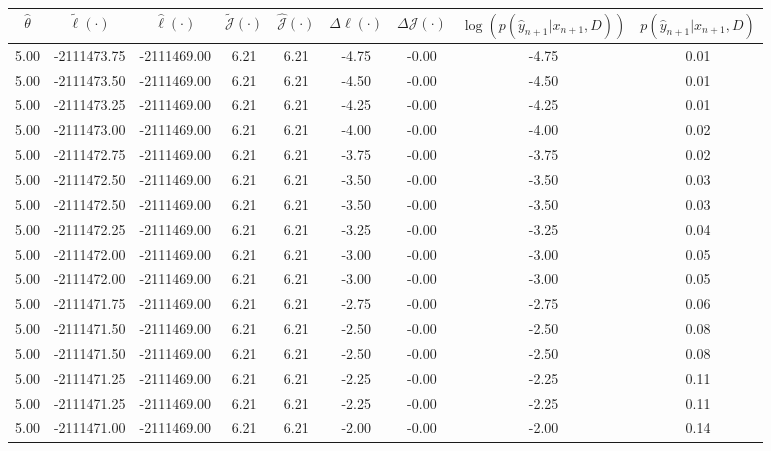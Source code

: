 \begin{table}[htbp]
        \centering
        \tiny
        \begin{adjustbox}{angle=90}
            \begin{tabular}{|c|c|c|c|c|c|c|c|c|}
                \hline
                 $\hat{\theta}$ & $\tilde{\ell}(\cdot)$ & $\hat{\ell}(\cdot)$ & $\tilde{\mathcal{J}}(\cdot)$ & $\hat{\mathcal{J}}(\cdot)$ & $\Delta \ell(\cdot)$ & $\Delta \mathcal{J}(\cdot)$ & $\log(p(\hat{y}_{n+1}|x_{n+1}, D))$ & $p(\hat{y}_{n+1}|x_{n+1}, D)$ \\
                \hline
                 5.00 & -2111473.75 & -2111469.00 & 6.21 & 6.21 & -4.75 & -0.00 & -4.75 & 0.01\\ \hline
 5.00 & -2111473.50 & -2111469.00 & 6.21 & 6.21 & -4.50 & -0.00 & -4.50 & 0.01\\ \hline
 5.00 & -2111473.25 & -2111469.00 & 6.21 & 6.21 & -4.25 & -0.00 & -4.25 & 0.01\\ \hline
 5.00 & -2111473.00 & -2111469.00 & 6.21 & 6.21 & -4.00 & -0.00 & -4.00 & 0.02\\ \hline
 5.00 & -2111472.75 & -2111469.00 & 6.21 & 6.21 & -3.75 & -0.00 & -3.75 & 0.02\\ \hline
 5.00 & -2111472.50 & -2111469.00 & 6.21 & 6.21 & -3.50 & -0.00 & -3.50 & 0.03\\ \hline
 5.00 & -2111472.50 & -2111469.00 & 6.21 & 6.21 & -3.50 & -0.00 & -3.50 & 0.03\\ \hline
 5.00 & -2111472.25 & -2111469.00 & 6.21 & 6.21 & -3.25 & -0.00 & -3.25 & 0.04\\ \hline
 5.00 & -2111472.00 & -2111469.00 & 6.21 & 6.21 & -3.00 & -0.00 & -3.00 & 0.05\\ \hline
 5.00 & -2111472.00 & -2111469.00 & 6.21 & 6.21 & -3.00 & -0.00 & -3.00 & 0.05\\ \hline
 5.00 & -2111471.75 & -2111469.00 & 6.21 & 6.21 & -2.75 & -0.00 & -2.75 & 0.06\\ \hline
 5.00 & -2111471.50 & -2111469.00 & 6.21 & 6.21 & -2.50 & -0.00 & -2.50 & 0.08\\ \hline
 5.00 & -2111471.50 & -2111469.00 & 6.21 & 6.21 & -2.50 & -0.00 & -2.50 & 0.08\\ \hline
 5.00 & -2111471.25 & -2111469.00 & 6.21 & 6.21 & -2.25 & -0.00 & -2.25 & 0.11\\ \hline
 5.00 & -2111471.25 & -2111469.00 & 6.21 & 6.21 & -2.25 & -0.00 & -2.25 & 0.11\\ \hline
 5.00 & -2111471.00 & -2111469.00 & 6.21 & 6.21 & -2.00 & -0.00 & -2.00 & 0.14\\ \hline

\end{tabular}
\end{adjustbox}
\end{table}
